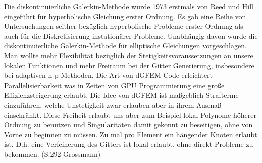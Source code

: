 Die diskontinuierliche Galerkin-Methode wurde 1973 erstmals von Reed und Hill eingeführt für hyperbolische Gleichung erster Ordnung. Es gab eine Reihe von Untersuchungen seither bezüglich hyperbolische Probleme erster Ordnung als auch für die Diskretisierung instationärer Probleme.
Unabhängig davon wurde die diskontinuierliche Galerkin-Methode für elliptische Gleichungen vorgeschlagen. Man wollte mehr Flexibilität bezüglich der Stetigkeitsvoraussetzungen an unsere lokalen Funktionen und mehr Freiraum bei der Gitter Generierung, insbesondere bei adaptiven h-p-Methoden. 
Die Art von dGFEM-Code erleichtert Parallelisierbarkeit was in Zeiten von GPU Programmierung eine große Effizienzsteigerung erlaubt. 
Die Idee von dGFEM ist maßgeblich Strafterme einzuführen, welche Unstetigkeit zwar erlauben aber in ihrem Ausmaß einschränkt. Diese Freiheit erlaubt uns aber zum Beispiel lokal Polynome höherer Ordnung zu benutzen und Singularitäten damit gekonnt zu beseitigen, ohne von Vorne zu beginnen zu müssen. Zu mal pro Element ein hängender Knoten erlaubt ist. D.h. eine Verfeinerung des Gitters ist lokal erlaubt, ohne direkt Probleme zu bekommen. (S.292 Grossmann)
